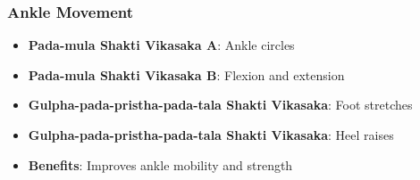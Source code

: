 \begin{frame}[fragile]\frametitle{Ankle Movement}
      \begin{itemize}
		\item \textbf{Pada-mula Shakti Vikasaka A}: Ankle circles
		\item \textbf{Pada-mula Shakti Vikasaka B}: Flexion and extension
		\item \textbf{Gulpha-pada-pristha-pada-tala Shakti Vikasaka}: Foot stretches
		\item \textbf{Gulpha-pada-pristha-pada-tala Shakti Vikasaka}: Heel raises
		\item \textbf{Benefits}: Improves ankle mobility and strength
	  \end{itemize}
\end{frame}


